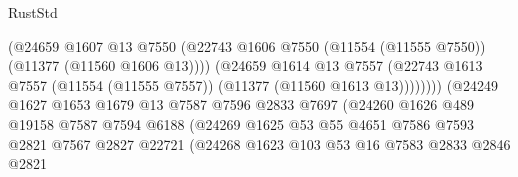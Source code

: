 \begin{lexlean}{RustStd}
\begin{coremodule}
                                          (@24659
                                            @1607
                                            @13
                                            @7550
                                            (@22743
                                              @1606
                                              @7550
                                              (@11554 (@11555 @7550))
                                              (@11377 (@11560 @1606 @13))))
                                          (@24659
                                            @1614
                                            @13
                                            @7557
                                            (@22743
                                              @1613
                                              @7557
                                              (@11554 (@11555 @7557))
                                              (@11377 (@11560 @1613 @13))))))))
                                  (@24249
                                    @1627
                                    @1653
                                    @1679
                                    @13
                                    @7587
                                    @7596
                                    @2833
                                    @7697
                                    (@24260
                                      @1626
                                      @489
                                      @19158
                                      @7587
                                      @7594
                                      @6188
                                      (@24269
                                        @1625
                                        @53
                                        @55
                                        @4651
                                        @7586
                                        @7593
                                        @2821
                                        @7567
                                        @2827
                                        @22721
                                        (@24268
                                          @1623
                                          @103
                                          @53
                                          @16
                                          @7583
                                          @2833
                                          @2846
                                          @2821

\end{coremodule}
\end{lexlean}
